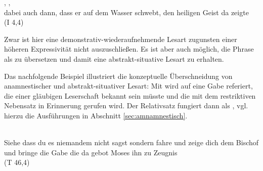 %

\begin{exe}
\ex \label{ex:I2245} \gll {}  ,      ,       \\
{dabei} {auch} {dann}, {dass} {er} {auf} {dem} {Wasser} {schwebt}, {den} {heiligen} {Geist} {da} {zeigte}\\
\glt {} (I 4,4)
\end{exe}

\noindent 
Zwar ist hier  eine demonstrativ-wiederaufnehmende Lesart zugunsten einer höheren Expressivität nicht auszuschließen. Es ist aber auch möglich, die Phrase als  zu übersetzen und damit eine abstrakt-situative Lesart zu erhalten. 



Das nachfolgende Beispiel illustriert die konzeptuelle Überschneidung von anamnestischer und abstrakt-situativer Lesart: Mit  wird auf eine Gabe referiert, die einer gläubigen Leserschaft bekannt sein müsste und die mit dem restriktiven Nebensatz in Erinnerung gerufen wird. Der Relativsatz fungiert dann als  \parencite[78-79]{Himmelmann1997}, vgl. hierzu die Ausführungen in Abschnitt \ref{sec:amnamnestisch}. 

%

\begin{exe}
\ex \label{ex:T9827} \gll {}       \object{,}                   \\
{Siehe} {dass} {du} {es} {niemandem} {nicht} {sagst} {} {sondern} {fahre} {und} {zeige} {dich} {dem} {Bischof} {und} {bringe} {die} {Gabe} {die} {da} {gebot} {Moses} {ihn} {zu} {Zeugnis} {}\\
\glt {} (T 46,4)
\end{exe}


